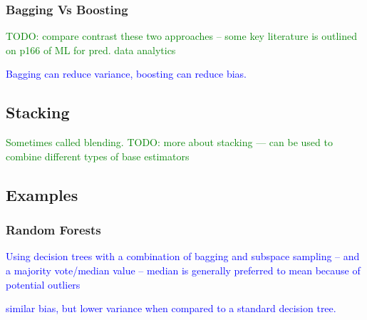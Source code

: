 \subsubsection{Bagging Vs Boosting}

\textcolor{green}{TODO: compare contrast these two approaches -- some key literature is outlined on p166 of ML for pred. data analytics}

\textcolor{blue}{Bagging can reduce variance, boosting can reduce bias.}

\subsection{Stacking}

\textcolor{green}{Sometimes called {blending}. TODO: more about stacking --- can be used to combine different types of base estimators}


\subsection{Examples}

\subsubsection{Random Forests}

\textcolor{blue}{Using decision trees with a combination of bagging and subspace sampling -- and a majority vote/median value -- median is generally preferred to mean because of potential outliers}

\textcolor{blue}{similar bias, but lower variance when compared to a standard decision tree.}
